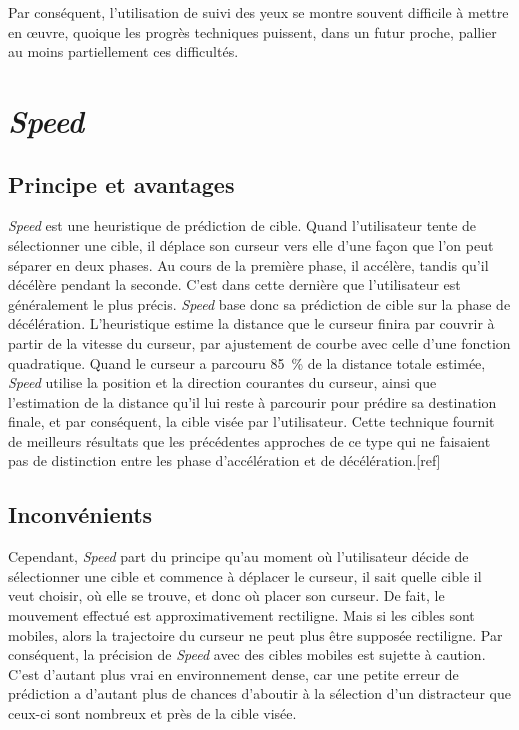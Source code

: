 	Par conséquent, l'utilisation de suivi des yeux se montre souvent difficile à mettre en œuvre, quoique les progrès techniques puissent, dans un futur proche, pallier au moins partiellement ces difficultés.
		
\section{\emph{Speed}}
	\subsection{Principe et avantages}
	\emph{Speed} est une heuristique de prédiction de cible. Quand l'utilisateur tente de sélectionner une cible, il déplace son curseur vers elle d'une façon que l'on peut séparer en deux phases. Au cours de la première phase, il accélère, tandis qu'il décélère pendant la seconde. C'est dans cette dernière que l'utilisateur est généralement le plus précis. \emph{Speed} base donc sa prédiction de cible sur la phase de décélération. L'heuristique estime la distance que le curseur finira par couvrir à partir de la vitesse du curseur, par ajustement de courbe avec celle d'une fonction quadratique. Quand le curseur a parcouru 85~\%{} de la distance totale estimée, \emph{Speed} utilise la position et la direction courantes du curseur, ainsi que l'estimation de la distance qu'il lui reste à parcourir pour prédire sa destination finale, et par conséquent, la cible visée par l'utilisateur. Cette technique fournit de meilleurs résultats que les précédentes approches de ce type qui ne faisaient pas de distinction entre les phase d'accélération et de décélération.[ref]
			
	\subsection{Inconvénients}
	Cependant, \emph{Speed} part du principe qu'au moment où l'utilisateur décide de sélectionner une cible et commence à déplacer le curseur, il sait quelle cible il veut choisir, où elle se trouve, et donc où placer son curseur. De fait, le mouvement effectué est approximativement rectiligne. Mais si les cibles sont mobiles, alors la trajectoire du curseur ne peut plus être supposée rectiligne. Par conséquent, la précision de \emph{Speed} avec des cibles mobiles est sujette à caution. C'est d'autant plus vrai en environnement dense, car une petite erreur de prédiction a d'autant plus de chances d'aboutir à la sélection d'un distracteur que ceux-ci sont nombreux et près de la cible visée.
		
